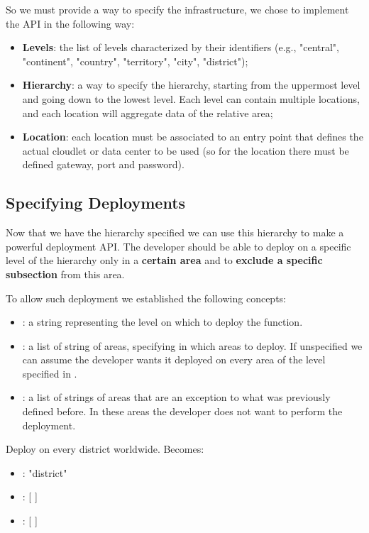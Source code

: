 So we must provide a way to specify the infrastructure, we chose to implement the API in the following way:
\begin{itemize}
    \item \textbf{Levels}: the list of levels characterized by their identifiers (e.g., "central", "continent", "country", "territory", "city", "district");
    \item \textbf{Hierarchy}: a way to specify the hierarchy, starting from the uppermost level and going down to the lowest level. Each level can contain multiple locations, and each location will aggregate data of the relative area;
    \item \textbf{Location}: each location must be associated to an entry point that defines the actual cloudlet or data center to be used (so for the location there must be defined gateway, port and password).
\end{itemize}


\subsection{Specifying Deployments}
Now that we have the hierarchy specified we can use this hierarchy to make a powerful deployment API. The developer should be able to deploy on a specific level of the hierarchy only in a \textbf{certain area} and to \textbf{exclude a specific subsection} from this area.

To allow such deployment we established the following concepts:
\begin{itemize}
    \item {}: a string representing the level on which to deploy the function.
    \item {}: a list of string of areas, specifying in which areas to deploy. If unspecified we can assume the developer wants it deployed on every area of the level specified in . 
    \item {}: a list of strings of areas that are an exception to what was previously defined before. In these areas the developer does not want to perform the deployment.
\end{itemize}

\begin{example}
Deploy on every district worldwide.
Becomes:
\begin{itemize}
    \item {}: "district"
    \item {}: [ ]
    \item {}: [ ]
\end{itemize}
\end{example}

